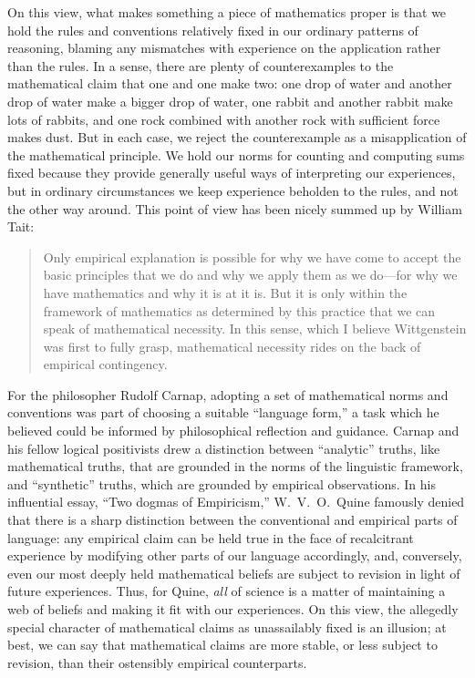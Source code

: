 \documentclass[11pt]{article}
\begin{document}
On this view, what makes something a piece of mathematics proper is that we hold the rules and conventions relatively fixed in our ordinary patterns of reasoning, blaming any mismatches with experience on the application rather than the rules. In a sense, there are plenty of counterexamples to the mathematical claim that one and one make two: one drop of water and another drop of water make a bigger drop of water, one rabbit and another rabbit make lots of rabbits, and one rock combined with another rock with sufficient force makes dust. But in each case, we reject the counterexample as a misapplication of the mathematical principle. We hold our norms for counting and computing sums fixed because they provide generally useful ways of interpreting our experiences, but in ordinary circumstances we keep experience beholden to the rules, and not the other way around. This point of view has been nicely summed up by William Tait:
\begin{quote}
Only empirical explanation is possible for why we have come to accept the basic principles that we do and why we apply them as we do---for why we have mathematics and why it is at it is. But it is only within the framework of mathematics as determined by this practice that we can speak of mathematical necessity. In this sense, which I believe Wittgenstein was first to fully grasp, mathematical necessity rides on the back of empirical contingency.
\end{quote}

For the philosopher Rudolf Carnap, adopting a set of mathematical norms and conventions was part of choosing a suitable ``language form,'' a task which he believed could be informed by philosophical reflection and guidance. Carnap and his fellow logical positivists drew a distinction between ``analytic'' truths, like mathematical truths, that are grounded in the norms of the linguistic framework, and ``synthetic'' truths, which are grounded by empirical observations. In his influential essay, ``Two dogmas of Empiricism,'' W.~V.~O.~Quine famously denied that there is a sharp distinction between the conventional and empirical parts of language: any empirical claim can be held true in the face of recalcitrant experience by modifying other parts of our language accordingly, and, conversely, even our most deeply held mathematical beliefs are subject to revision in light of future experiences. Thus, for Quine, \emph{all} of science is a matter of maintaining a web of beliefs and making it fit with our experiences. On this view, the allegedly special character of mathematical claims as unassailably fixed is an illusion; at best, we can say that mathematical claims are more stable, or less subject to revision, than their ostensibly empirical counterparts.
\end{document}
